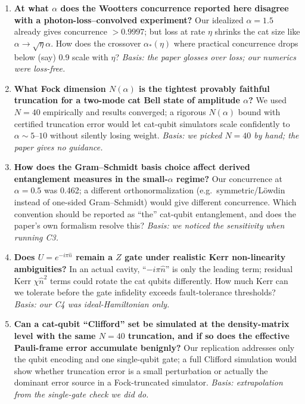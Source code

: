 \documentclass[11pt,letterpaper]{article}
\begin{document}
\begin{enumerate}[label=Q\arabic*.]
  \item \textbf{At what $\alpha$ does the Wootters concurrence
        reported here disagree with a photon-loss--convolved
        experiment?} Our idealized $\alpha=1.5$ already gives
        concurrence $>0.9997$; but loss at rate $\eta$ shrinks the
        cat size like $\alpha \to \sqrt{\eta}\alpha$. How does the
        crossover $\alpha_\ast(\eta)$ where practical concurrence
        drops below (say) 0.9 scale with $\eta$?
        \emph{Basis: the paper glosses over loss; our numerics were
        loss-free.}
  \item \textbf{What Fock dimension $N(\alpha)$ is the tightest
        provably faithful truncation for a two-mode cat Bell state
        of amplitude $\alpha$?} We used $N=40$ empirically and
        results converged; a rigorous $N(\alpha)$ bound with
        certified truncation error would let cat-qubit simulators
        scale confidently to $\alpha \sim 5$--$10$ without silently
        losing weight.
        \emph{Basis: we picked $N=40$ by hand; the paper gives no guidance.}
  \item \textbf{How does the Gram--Schmidt basis choice affect
        derived entanglement measures in the small-$\alpha$ regime?}
        Our concurrence at $\alpha=0.5$ was 0.462; a different
        orthonormalization (e.g.\ symmetric/L\"owdin instead of
        one-sided Gram--Schmidt) would give different concurrence.
        Which convention should be reported as ``the'' cat-qubit
        entanglement, and does the paper's own formalism resolve
        this?
        \emph{Basis: we noticed the sensitivity when running C3.}
  \item \textbf{Does $U = e^{-i\pi \hat n}$ remain a $Z$ gate under
        realistic Kerr non-linearity ambiguities?} In an actual
        cavity, ``$-i\pi \hat n$'' is only the leading term; residual
        Kerr $\chi \hat n^2$ terms could rotate the cat qubits
        differently. How much Kerr can we tolerate before the gate
        infidelity exceeds fault-tolerance thresholds?
        \emph{Basis: our C4 was ideal-Hamiltonian only.}
  \item \textbf{Can a cat-qubit ``Clifford'' set be simulated at the
        density-matrix level with the same $N=40$ truncation, and if
        so does the effective Pauli-frame error accumulate benignly?}
        Our replication addresses only the qubit encoding and one
        single-qubit gate; a full Clifford simulation would show
        whether truncation error is a small perturbation or actually
        the dominant error source in a Fock-truncated simulator.
        \emph{Basis: extrapolation from the single-gate check we did do.}
\end{enumerate}
\end{document}

